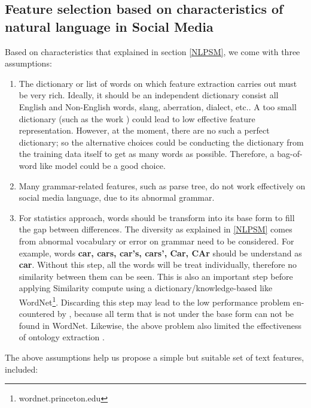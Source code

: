 \documentclass{llncs}
\begin{document}
\subsection{Feature selection based on characteristics of natural language in Social Media}
\label{Features}

Based on characteristics that explained in section \ref{NLPSM}, we come with three assumptions:

\begin{enumerate}
\item The dictionary or list of words on which feature extraction carries out must be very rich. Ideally, it should be an independent dictionary consist all English and Non-English words, slang, aberration, dialect, etc.. A too small dictionary (such as the work \cite{schinas2012certh}) could lead to low effective feature representation. However, at the moment, there are no such a perfect dictionary; so the alternative choices could be conducting the dictionary from the training data itself to get as many words as possible. Therefore, a bag-of-word like model could be a good choice.

\item Many grammar-related features, such as parse tree, do not work effectively on social media language, due to its abnormal grammar.

\item For statistics approach, words should be transform into its base form to fill the gap between differences. The diversity as explained in \ref{NLPSM} comes from abnormal vocabulary or error on grammar need to be considered. For example, words \textbf{car, cars, car's, cars', Car, CAr} should be understand as \textbf{car}. Without this step, all the words will be treat individually, therefore no similarity between them can be seen. This is also an important step before applying Similarity compute using a dictionary/knowledge-based like WordNet\footnote{wordnet.princeton.edu}. Discarding this step may lead to the low performance problem en-countered by \cite{itikavit}, because all term that is not under the base form can not be found in WordNet. Likewise, the above problem also limited the effectiveness of ontology extraction \cite{daoICMR14}.

\end{enumerate}

The above assumptions help us propose a simple but suitable set of text features, included:
\end{document}
